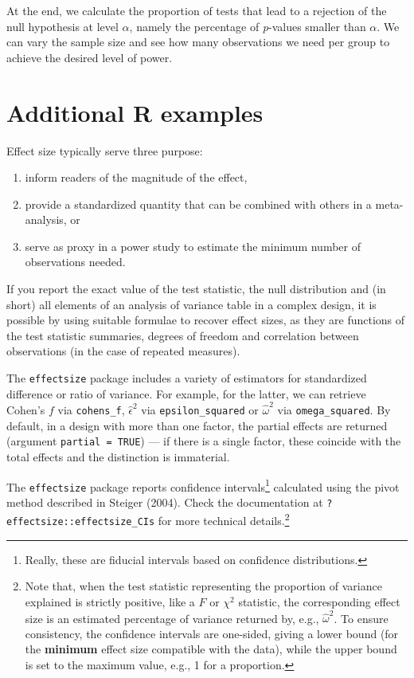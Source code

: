 \documentclass[
  11pt,
  letterpaper,
]{scrbook}
\providecommand{\tightlist}{%
  \setlength{\itemsep}{0pt}\setlength{\parskip}{0pt}}\usepackage{longtable,booktabs,array}
\theoremstyle{definition}
\theoremstyle{definition}
\theoremstyle{remark}
\begin{document}
At the end, we calculate the proportion of tests that lead to a
rejection of the null hypothesis at level \(\alpha\), namely the
percentage of \emph{p}-values smaller than \(\alpha\). We can vary the
sample size and see how many observations we need per group to achieve
the desired level of power.

\section{\texorpdfstring{Additional \textbf{R}
examples}{Additional R examples}}\label{additional-r-examples}

Effect size typically serve three purpose:

\begin{enumerate}
\def\labelenumi{\arabic{enumi}.}
\tightlist
\item
  inform readers of the magnitude of the effect,
\item
  provide a standardized quantity that can be combined with others in a
  meta-analysis, or
\item
  serve as proxy in a power study to estimate the minimum number of
  observations needed.
\end{enumerate}

If you report the exact value of the test statistic, the null
distribution and (in short) all elements of an analysis of variance
table in a complex design, it is possible by using suitable formulae to
recover effect sizes, as they are functions of the test statistic
summaries, degrees of freedom and correlation between observations (in
the case of repeated measures).

The \texttt{effectsize} package includes a variety of estimators for
standardized difference or ratio of variance. For example, for the
latter, we can retrieve Cohen's \(f\) via \texttt{cohens\_f},
\(\widehat{\epsilon}^2\) via \texttt{epsilon\_squared} or
\(\widehat{\omega}^2\) via \texttt{omega\_squared}. By default, in a
design with more than one factor, the partial effects are returned
(argument \texttt{partial\ =\ TRUE}) --- if there is a single factor,
these coincide with the total effects and the distinction is immaterial.

The \texttt{effectsize} package reports confidence intervals\footnote{Really,
  these are fiducial intervals based on confidence distributions.}
calculated using the pivot method described in Steiger (2004). Check the
documentation at \texttt{?effectsize::effectsize\_CIs} for more
technical details.\footnote{Note that, when the test statistic
  representing the proportion of variance explained is strictly
  positive, like a \(F\) or \(\chi^2\) statistic, the corresponding
  effect size is an estimated percentage of variance returned by, e.g.,
  \(\widehat{\omega}^2\). To ensure consistency, the confidence
  intervals are one-sided, giving a lower bound (for the
  \textbf{minimum} effect size compatible with the data), while the
  upper bound is set to the maximum value, e.g., 1 for a proportion.}
\end{document}

